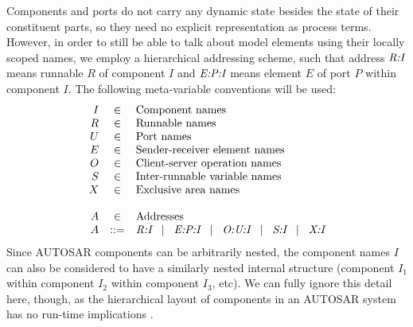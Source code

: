 \documentclass[twocolumn]{article}
\begin{document}
Components and ports do not carry any dynamic state besides the state of their constituent parts, so they need no explicit representation as process terms. However, in order to still be able to talk about model elements using their locally scoped names, we employ a hierarchical addressing scheme, such that address $\emph{R:I}$ means runnable $R$ of component $I$ and $\emph{E:P:I}$ means element $E$ of port $P$ within component $I$. The following meta-variable conventions will be used:
%
\[
\begin{array}{rcll}
	I	& \in		& \text{Component names} \\
	R	& \in		& \text{Runnable names} \\
	U	& \in		& \text{Port names} \\
	E	& \in		& \text{Sender-receiver element names} \\
	O	& \in		& \text{Client-server operation names} \\
	S	& \in		& \text{Inter-runnable variable names} \\
	X	& \in		& \text{Exclusive area names} \\
	\\
	A	& \in		& \text{Addresses} \\
	A	& ::=		& \emph{R:I}   \hspace{2ex}|\hspace{2ex}   \emph{E:P:I}   \hspace{2ex}|\hspace{2ex}   \emph{O:U:I}   \hspace{2ex}|\hspace{2ex}   \emph{S:I}   \hspace{2ex}|\hspace{2ex}   \emph{X:I}   \\
\end{array}
\]
%
Since AUTOSAR components can be arbitrarily nested, the component names $I$ can also be considered to have a similarly nested internal structure (component $I_1$ within component $I_2$ within component $I_3$, etc). We can fully ignore this detail here, though, as the hierarchical layout of components in an AUTOSAR system has no run-time implications \cite{TODO2}.
\end{document}
